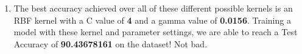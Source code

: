 \documentclass[12pt]{article}
\begin{document}
\begin{enumerate}[label=\alph*.]
\item The best accuracy achieved over all of these different possible kernels is an RBF kernel with a C value of \textbf{4} and a gamma value of \textbf{0.0156}. Training a model with these kernel and parameter settings, we are able to reach a Test Accuracy of \textbf{90.43678161} on the dataset! Not bad.

\end{enumerate}

%
%
\end{document}
